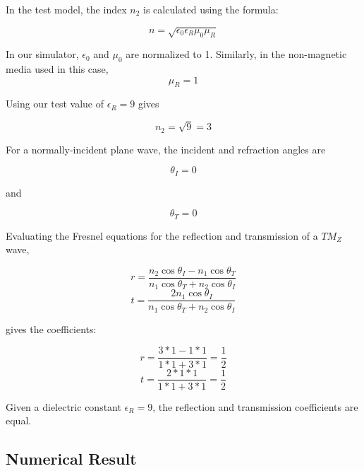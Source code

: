 In the test model, the index $n_2$ is calculated using the formula:

\begin{equation}
n = \sqrt{\epsilon_0 \epsilon_R \mu_0 \mu_R}
\end{equation}

In our simulator, $\epsilon_0$ and $\mu_0$ are normalized to 1. Similarly, in the non-magnetic media used in this case, 
\begin{equation}
\mu_R = 1
\end{equation}

Using our test value of $\epsilon_R = 9$ gives 

\begin{equation}
n_2 = \sqrt{9} = 3
\end{equation}

\clearpage

For a normally-incident plane wave, the incident and refraction angles are

\begin{equation}
\theta_I = 0
\end{equation}

and

\begin{equation}
\theta_T = 0
\end{equation}

Evaluating the Fresnel equations for the reflection and transmission of a $TM_Z$ wave,

\begin{equation}
r = \frac{n_2 \cos \theta_I - n_1 \cos \theta_T}{n_1 \cos \theta_T + n_2 \cos \theta_I}
\end{equation}
\begin{equation}
t = \frac{2 n_1 \cos \theta_I}{n_1 \cos \theta_T + n_2 \cos \theta_I}
\end{equation}

gives the coefficients:

\begin{equation}
r = \frac{3 * 1- 1 * 1}{1 * 1 + 3 * 1} = \frac{1}{2}
\end{equation}
\begin{equation}
t = \frac{2 * 1 * 1}{1 * 1 + 3 * 1} = \frac{1}{2}
\end{equation}

Given a dielectric constant $\epsilon_R  = 9$, the reflection and transmission coefficients are equal.

\subsection{Numerical Result}


